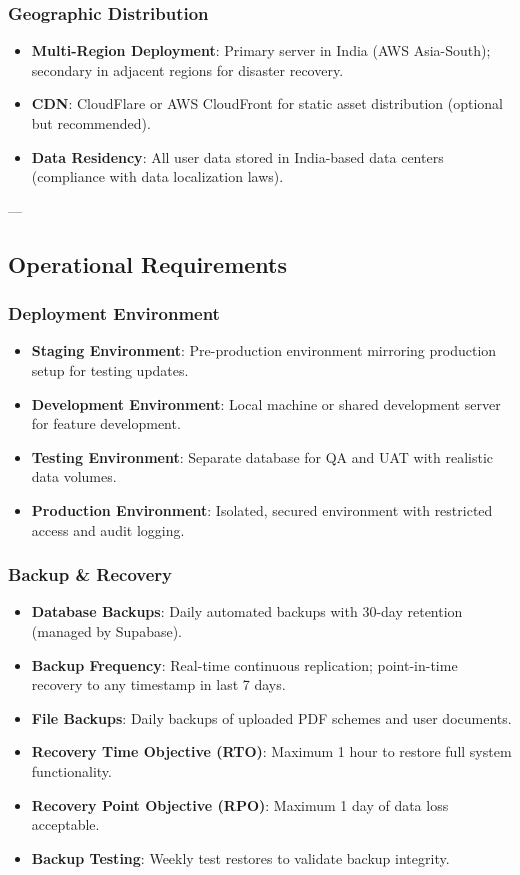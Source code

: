 \subsubsection{Geographic Distribution}
\begin{itemize}
    \item \textbf{Multi-Region Deployment}: Primary server in India (AWS Asia-South); secondary in adjacent regions for disaster recovery.
    \item \textbf{CDN}: CloudFlare or AWS CloudFront for static asset distribution (optional but recommended).
    \item \textbf{Data Residency}: All user data stored in India-based data centers (compliance with data localization laws).
\end{itemize}

---

\subsection{Operational Requirements}

\subsubsection{Deployment Environment}
\begin{itemize}
    \item \textbf{Staging Environment}: Pre-production environment mirroring production setup for testing updates.
    \item \textbf{Development Environment}: Local machine or shared development server for feature development.
    \item \textbf{Testing Environment}: Separate database for QA and UAT with realistic data volumes.
    \item \textbf{Production Environment}: Isolated, secured environment with restricted access and audit logging.
\end{itemize}

\subsubsection{Backup \& Recovery}
\begin{itemize}
    \item \textbf{Database Backups}: Daily automated backups with 30-day retention (managed by Supabase).
    \item \textbf{Backup Frequency}: Real-time continuous replication; point-in-time recovery to any timestamp in last 7 days.
    \item \textbf{File Backups}: Daily backups of uploaded PDF schemes and user documents.
    \item \textbf{Recovery Time Objective (RTO)}: Maximum 1 hour to restore full system functionality.
    \item \textbf{Recovery Point Objective (RPO)}: Maximum 1 day of data loss acceptable.
    \item \textbf{Backup Testing}: Weekly test restores to validate backup integrity.
\end{itemize}

